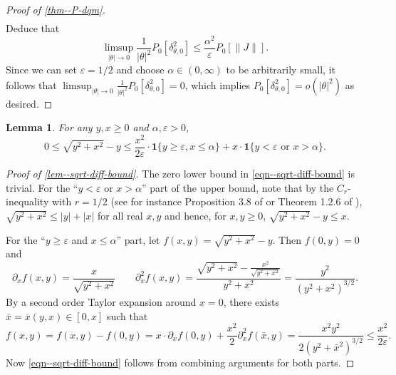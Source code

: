 \documentclass[12pt]{article}
\let\Cref\autoref
\theoremstyle{definition}
\theoremstyle{plain}
\newtheorem{lemma}{Lemma}
\begin{document}
\begin{proof}[Proof of \Cref{thm--P-dqm}]
\begin{equation*}
\begin{split}
  \end{split}
\end{equation*}
Deduce that
\begin{equation*}
  \limsup_{|\theta| \to 0} \frac{1}{|\theta|^{2}} P_{0} \left[ \delta_{\theta,
  0}^{2} \right] \leq \frac{\alpha^{2}}{\varepsilon} P_{0} [\|J\|].
\end{equation*}
Since we can set \(\varepsilon = 1 / 2\) and choose \(\alpha \in (0, \infty)\)
to be arbitrarily small, it follows that
\(\limsup_{|\theta| \to 0} \frac{1}{|\theta|^{2}} P_{0} \left[ \delta_{\theta,
  0}^{2} \right] = 0\), which implies \(P_{0} \left[ \delta_{\theta, 0}^{2}
\right] = o \left( |\theta|^{2} \right)\) as desired.
\end{proof}

\begin{lemma}
\label{lem--sqrt-diff-bound}
For any \(y, x \geq 0\) and \(\alpha, \varepsilon > 0\),
\begin{equation}
  0 \leq \sqrt{y^{2} + x^{2}} - y \leq \frac{x^{2}}{2 \varepsilon} \cdot
  \mathbf{1} \{y \geq \varepsilon, x \leq \alpha\} + x \cdot \mathbf{1} \{y <
  \varepsilon \text{ or } x > \alpha\}.
  \label{eqn--sqrt-diff-bound}
\end{equation}
\end{lemma}

\begin{proof}[Proof of \Cref{lem--sqrt-diff-bound}]
The zero lower bound in \eqref{eqn--sqrt-diff-bound} is trivial.
For the ``\(y < \varepsilon\) or \(x > \alpha\)'' part of the upper bound,
note that by the \(C_{r}\)-inequality with \(r = 1 / 2\) (see for instance
Proposition 3.8 of \citet[p. 35]{2001whiteAsymptoticTheoryEconometricians} or
Theorem 1.2.6 of \citet[p. 12--13]{1975lukacsStochasticConvergence}),
\(\sqrt{y^{2} + x^{2}} \leq |y| + |x|\) for all real \(x, y\) and hence, for
\(x, y \geq 0\), \(\sqrt{y^{2} + x^{2}} - y \leq x\).

For the ``\(y \geq \varepsilon\) and \(x \leq \alpha\)'' part, let \(f (x, y) =
\sqrt{y^{2} + x^{2}} - y\).
Then \(f (0, y) = 0\) and
\begin{equation*}
  \partial_{x} f (x, y) = \frac{x}{\sqrt{y ^{2} + x^{2}}} \qquad
  \partial_{x}^{2} f (x, y) = \frac{\sqrt{y ^{2} + x^{2}} - \frac{x^{2}}{\sqrt{y
  ^{2} + x^{2}}}}{y ^{2} + x^{2}} = \frac{y^{2}}{\left( y^{2} + x^{2} \right)^{3
  / 2}}.
\end{equation*}
By a second order Taylor expansion around \(x = 0\), there exists \(\bar{x}
= \overline{x} (y, x) \in [0, x]\) such that
\begin{equation*}
  f (x, y) = f (x, y) - f (0, y) = x \cdot \partial_{x} f (0, y) +
  \frac{x^{2}}{2} \partial_{x}^{2} f \left( \bar{x}, y \right)
  = \frac{x^{2} y^{2}}{2 \left( y^{2} + \bar{x}^{2} \right)^{3
  / 2}} \leq \frac{x^{2}}{2 \varepsilon}.
\end{equation*}
Now \eqref{eqn--sqrt-diff-bound} follows from combining arguments for both
parts.
\end{proof}
\end{document}
